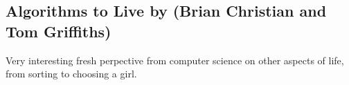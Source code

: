 \subsection{Algorithms to Live by (Brian Christian and Tom Griffiths)}

Very interesting fresh perpective from computer science on other aspects of life, from sorting to choosing a girl.
